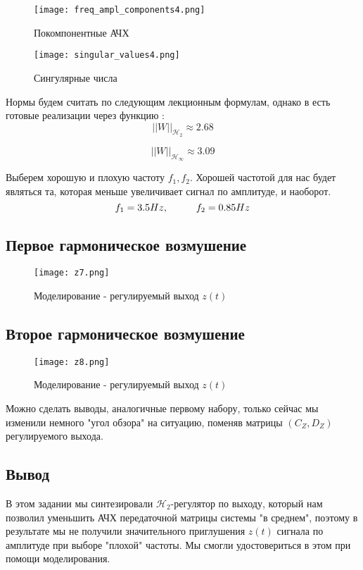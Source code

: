 \begin{figure}[ht]
    \centering
    \texttt{[image: freq\_ampl\_components4.png]}
    \caption{Покомпонентные АЧХ}
  \end{figure}

\begin{figure}[ht]
  \centering
  \texttt{[image: singular\_values4.png]}
  \caption{Сингулярные числа}
\end{figure}
Нормы будем считать по следующим лекционным формулам, однако в  
есть готовые реализации через функцию :
$$
    ||W||_{\mathcal{H}_2}   \approx 2.68
$$

$$
    ||W||_{\mathcal{H}_\infty}  \approx 3.09
$$

Выберем хорошую и плохую частоту $f_1, f_2$. 
Хорошей частотой для нас будет являться та, которая меньше увеличивает сигнал по амплитуде, и наоборот.
$$
    f_1 = 3.5 Hz, \hspace*{1cm} f_2 = 0.85 Hz
$$

\subsection{Первое гармоническое возмушение}
\begin{figure}[ht]
    \centering
    \texttt{[image: z7.png]}
    \caption{Моделирование -  регулируемый выход $z(t)$}
  \end{figure}

\subsection{Второе гармоническое возмушение}
\begin{figure}[ht]
    \centering
    \texttt{[image: z8.png]}
    \caption{Моделирование -  регулируемый выход $z(t)$}
\end{figure}

Можно сделать выводы, аналогичные первому набору, только сейчас мы изменили немного "угол обзора" на ситуацию, поменяв матрицы $(C_Z,D_Z)$ регулируемого выхода.

\subsection{Вывод}
В этом задании мы синтезировали $\mathcal{H}_2$-регулятор по выходу, который нам позволил 
уменьшить АЧХ передаточной матрицы системы "в среднем", поэтому в результате мы не получили значительного 
приглушения $z(t)$ сигнала по амплитуде при выборе "плохой" частоты. 
Мы смогли удостовериться в этом при помощи моделирования.
\endinput